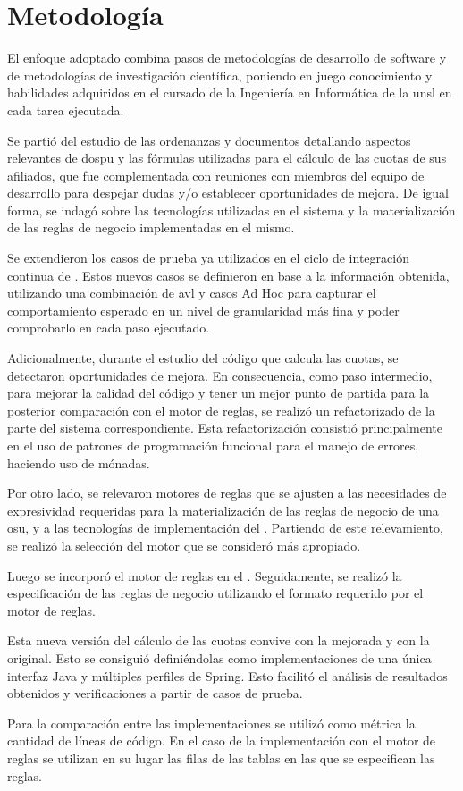 \section{Metodología} \label{sec:metodologia}

El enfoque adoptado combina pasos de metodologías de desarrollo de software y de metodologías de investigación científica, poniendo en juego conocimiento y habilidades adquiridos en el cursado de la Ingeniería en Informática de la \acrshort{unsl} en cada tarea ejecutada.

Se partió del estudio de las ordenanzas y documentos detallando aspectos relevantes de \acrshort{dospu} y las fórmulas utilizadas para el cálculo de las cuotas de sus afiliados, que fue complementada con reuniones con miembros del equipo de desarrollo {\SIDOSPU} para despejar dudas y/o establecer oportunidades de mejora. 
De igual forma, se indagó sobre las tecnologías utilizadas en el sistema y la materialización de las reglas de negocio implementadas en el mismo.

Se extendieron los casos de prueba ya utilizados en el ciclo de integración continua de {\SIDOSPU}.
Estos nuevos casos se definieron en base a la información obtenida, utilizando una combinación de \acrfull{avl} \cite{Jorgensen2014} y casos Ad Hoc para capturar el comportamiento esperado en un nivel de granularidad más fina y poder comprobarlo en cada paso ejecutado.

Adicionalmente, durante el estudio del código que calcula las cuotas, se detectaron oportunidades de mejora. 
En consecuencia, como paso intermedio, para mejorar la calidad del código y tener un mejor punto de partida para la posterior comparación con el motor de reglas, se realizó un refactorizado de la parte del sistema correspondiente. 
Esta refactorización consistió principalmente en el uso de patrones de programación funcional para el manejo de errores, haciendo uso de mónadas.

Por otro lado, se relevaron motores de reglas que se ajusten a las necesidades de expresividad requeridas para la materialización de las reglas de negocio de una \acrshort{osu}, y a las tecnologías de implementación del {\SIDOSPU}. 
Partiendo de este relevamiento, se realizó la selección del motor que se consideró más apropiado.

Luego se incorporó el motor de reglas en el {\SIDOSPU}.
Seguidamente, se realizó la especificación de las reglas de negocio utilizando el formato requerido por el motor de reglas.

Esta nueva versión del cálculo de las cuotas convive con la mejorada y con la original. 
Esto se consiguió definiéndolas como implementaciones de una única interfaz Java y múltiples perfiles de Spring. 
Esto facilitó el análisis de resultados obtenidos y verificaciones a partir de casos de prueba. 

Para la comparación entre las implementaciones se utilizó como métrica la cantidad de líneas de código.  
En el caso de la implementación con el motor de reglas se utilizan en su lugar las filas de las tablas en las que se especifican las reglas.
